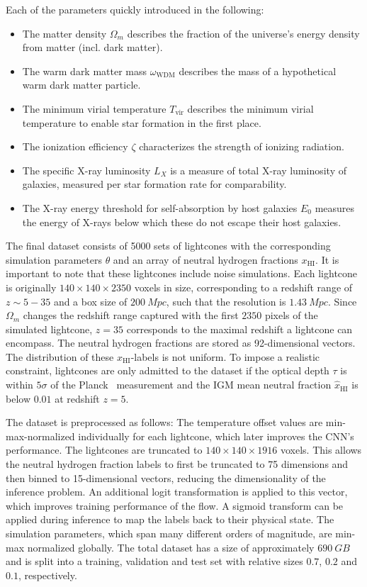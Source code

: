 Each of the parameters quickly introduced in the following:
\begin{itemize}
    \item   The matter density $\Omega_m$ describes the fraction of the universe's energy density from matter (incl. dark matter).
    \item   The warm dark matter mass $\omega_{\text{WDM}}$ describes the mass of a hypothetical warm dark matter particle.
    \item   The minimum virial temperature $T_{\text{vir}}$  describes the minimum virial temperature to enable star formation in the first place.
    \item   The ionization efficiency $\zeta$ characterizes the strength of ionizing radiation.
    \item   The specific X-ray luminosity $L_X$ is a measure of total X-ray luminosity of galaxies, measured per star formation rate for comparability.
    \item   The X-ray energy threshold for self-absorption by host galaxies $E_0$ measures the energy of X-rays below which these do not escape their host galaxies.
\end{itemize}

The final dataset consists of 5000 sets of lightcones with the corresponding simulation parameters $\theta$ and an array of neutral hydrogen fractions $x_\text{HI}$. It is important to note that these lightcones include noise simulations. Each lightcone is originally $140\times 140\times 2350$ voxels in size, corresponding to a redshift range of $z \sim 5-35$ and a box size of $200~\si{Mpc}$, such that the resolution is $1.43~\si{Mpc}$. Since $\Omega_m$ changes the redshift range captured with the first $2350$ pixels of the simulated lightcone, $z=35$ corresponds to the maximal redshift a lightcone can encompass. The neutral hydrogen fractions are stored as 92-dimensional vectors. The distribution of these $x_\text{HI}$-labels is not uniform. To impose a realistic constraint, lightcones are only admitted to the dataset if the optical depth $\tau$ is within $5\sigma$ of the Planck~\cite{planck_2018} measurement and the IGM mean neutral fraction $\hat{x}_\text{HI}$ is below $0.01$ at redshift $z=5$.

The dataset is preprocessed as follows: The temperature offset values are min-max-normalized individually for each lightcone, which later improves the CNN's performance. The lightcones are truncated to $140\times 140\times 1916$ voxels. This allows the neutral hydrogen fraction labels to first be truncated to 75 dimensions and then binned to 15-dimensional vectors, reducing the dimensionality of the inference problem. An additional logit transformation is applied to this vector, which improves training performance of the flow. A sigmoid transform can be applied during inference to map the labels back to their physical state. The simulation parameters, which span many different orders of magnitude, are min-max normalized globally. The total dataset has a size of approximately $690~\si{GB}$ and is split into a training, validation and test set with relative sizes $0.7$, $0.2$ and $0.1$, respectively. 

